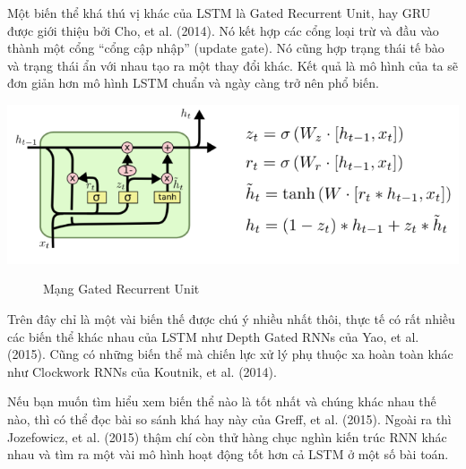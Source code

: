 Một biến thể khá thú vị khác của LSTM là Gated Recurrent Unit, hay GRU được giới thiệu bởi Cho, et al. (2014). Nó kết hợp các cổng loại trừ và đầu vào thành một cổng “cổng cập nhập” (update gate). Nó cũng hợp trạng thái tế bào và trạng thái ẩn với nhau tạo ra một thay đổi khác. Kết quả là mô hình của ta sẽ đơn giản hơn mô hình LSTM chuẩn và ngày càng trở nên phổ biến.
\begin{center}
    \includegraphics[scale=.5]{image/chapter6/bth3.png}
    \begin{figure}[htp]
    \begin{center}
     
    \end{center}
    \caption{Mạng Gated Recurrent Unit}
    \end{figure}
\end{center}
Trên đây chỉ là một vài biến thế được chú ý nhiều nhất thôi, thực tế có rất nhiều các biến thể khác nhau của LSTM như Depth Gated RNNs của Yao, et al. (2015). Cũng có những biến thể mà chiến lực xử lý phụ thuộc xa hoàn toàn khác như Clockwork RNNs của Koutnik, et al. (2014).

Nếu bạn muốn tìm hiểu xem biến thể nào là tốt nhất và chúng khác nhau thế nào, thì có thể đọc bài so sánh khá hay này của Greff, et al. (2015). Ngoài ra thì Jozefowicz, et al. (2015) thậm chí còn thử hàng chục nghìn kiến trúc RNN khác nhau và tìm ra một vài mô hình hoạt động tốt hơn cả LSTM ở một số bài toán.

